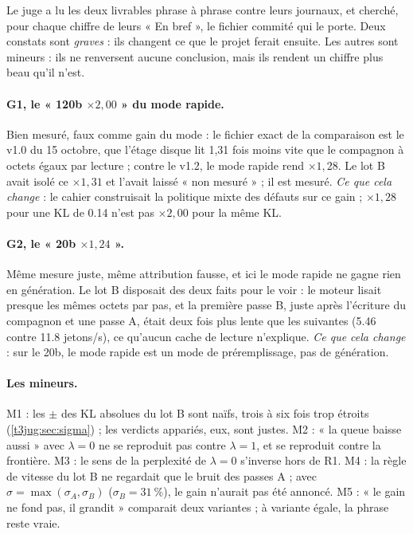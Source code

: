 Le juge a lu les deux livrables phrase à phrase contre leurs journaux, et cherché, pour chaque chiffre de leurs « En bref », le fichier commité qui le porte. Deux constats sont \emph{graves} : ils changent ce que le projet ferait ensuite. Les autres sont mineurs : ils ne renversent aucune conclusion, mais ils rendent un chiffre plus beau qu'il n'est.

\paragraph{G1, le « 120b $\times 2{,}00$ » du mode rapide.} Bien mesuré, faux comme gain du mode : le fichier exact de la comparaison est le v1.0 du 15 octobre, que l'étage disque lit 1,31 fois moins vite que le compagnon à octets égaux par lecture ; contre le v1.2, le mode rapide rend $\times 1{,}28$. Le lot B avait isolé ce $\times 1{,}31$ et l'avait laissé « non mesuré » ; il est mesuré. \emph{Ce que cela change} : le cahier construisait la politique mixte des défauts sur ce gain ; $\times 1{,}28$ pour une KL de \num{0.14} n'est pas $\times 2{,}00$ pour la même KL.

\paragraph{G2, le « 20b $\times 1{,}24$ ».} Même mesure juste, même attribution fausse, et ici le mode rapide ne gagne rien en génération. Le lot B disposait des deux faits pour le voir : le moteur lisait presque les mêmes octets par pas, et la première passe B, juste après l'écriture du compagnon et une passe A, était deux fois plus lente que les suivantes (\num{5.46} contre \num{11.8} jetons/s), ce qu'aucun cache de lecture n'explique. \emph{Ce que cela change} : sur le 20b, le mode rapide est un mode de préremplissage, pas de génération.

\paragraph{Les mineurs.} M1 : les $\pm$ des KL absolues du lot B sont naïfs, trois à six fois trop étroits (\cref{t3jug:sec:sigma}) ; les verdicts appariés, eux, sont justes. M2 : « la queue baisse aussi » avec $\lambda = 0$ ne se reproduit pas contre $\lambda = 1$, et se reproduit contre la frontière. M3 : le sens de la perplexité de $\lambda = 0$ s'inverse hors de R1. M4 : la règle de vitesse du lot B ne regardait que le bruit des passes A ; avec $\sigma = \max(\sigma_A, \sigma_B)$ ($\sigma_B = \SI{31}{\percent}$), le gain n'aurait pas été annoncé. M5 : « le gain ne fond pas, il grandit » comparait deux variantes ; à variante égale, la phrase reste vraie.

